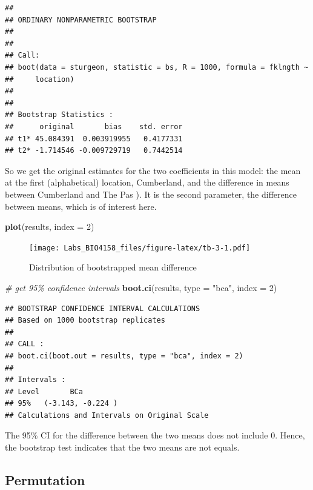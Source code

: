 \documentclass[
  12pt,
]{book}
\newenvironment{Shaded}{\begin{snugshade}}{\end{snugshade}}
\newcommand{\CommentTok}[1]{\textcolor[rgb]{0.56,0.35,0.01}{\textit{#1}}}
\newcommand{\DataTypeTok}[1]{\textcolor[rgb]{0.13,0.29,0.53}{#1}}
\newcommand{\DecValTok}[1]{\textcolor[rgb]{0.00,0.00,0.81}{#1}}
\newcommand{\KeywordTok}[1]{\textcolor[rgb]{0.13,0.29,0.53}{\textbf{#1}}}
\newcommand{\NormalTok}[1]{#1}
\newcommand{\StringTok}[1]{\textcolor[rgb]{0.31,0.60,0.02}{#1}}
\begin{document}
\begin{verbatim}
## 
## ORDINARY NONPARAMETRIC BOOTSTRAP
## 
## 
## Call:
## boot(data = sturgeon, statistic = bs, R = 1000, formula = fklngth ~ 
##     location)
## 
## 
## Bootstrap Statistics :
##      original       bias    std. error
## t1* 45.084391  0.003919955   0.4177331
## t2* -1.714546 -0.009729719   0.7442514
\end{verbatim}

So we get the original estimates for the two coefficients in this model: the mean at the first (alphabetical) location, Cumberland, and the difference in means between Cumberland and The Pas ). It is the second parameter, the difference between means, which is of interest here.

\begin{Shaded}
\begin{Highlighting}[]
\KeywordTok{plot}\NormalTok{(results, }\DataTypeTok{index =} \DecValTok{2}\NormalTok{)}
\end{Highlighting}
\end{Shaded}

\begin{figure}
\centering
\texttt{[image: Labs\_BIO4158\_files/figure-latex/tb-3-1.pdf]}
\caption{\label{fig:tb-3}Distribution of bootstrapped mean difference}
\end{figure}

\begin{Shaded}
\begin{Highlighting}[]
\CommentTok{\# get 95\% confidence intervals}
\KeywordTok{boot.ci}\NormalTok{(results, }\DataTypeTok{type =} \StringTok{"bca"}\NormalTok{, }\DataTypeTok{index =} \DecValTok{2}\NormalTok{)}
\end{Highlighting}
\end{Shaded}

\begin{verbatim}
## BOOTSTRAP CONFIDENCE INTERVAL CALCULATIONS
## Based on 1000 bootstrap replicates
## 
## CALL : 
## boot.ci(boot.out = results, type = "bca", index = 2)
## 
## Intervals : 
## Level       BCa          
## 95%   (-3.143, -0.224 )  
## Calculations and Intervals on Original Scale
\end{verbatim}

The 95\% CI for the difference between the two means does not include 0. Hence, the bootstrap test indicates that the two means are not equals.

\hypertarget{permutation}{%
\subsection{Permutation}\label{permutation}}
\end{document}
